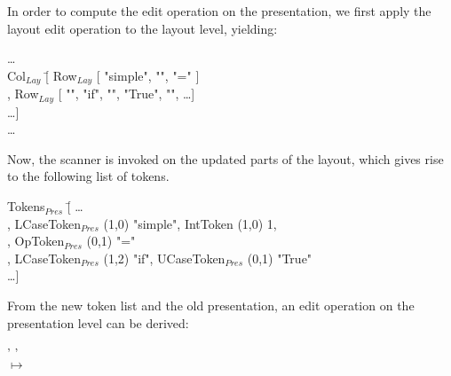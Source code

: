In order to compute the edit operation on the presentation, we first apply the layout edit operation to the layout level, yielding:

\small \ttfamily
\begin{tabbing}
\dots\\
Col$_{Lay}$ \= [ Row$_{Lay}$ [ "simple", "\textvisiblespace", "=" ]\\
                   \> , Row$_{Lay}$ [ "\textvisiblespace\textvisiblespace", 
                                                 "if", "\textvisiblespace", "True", "\textvisiblespace", \dots ] \\
                   \> \dots ]\\
\dots
\end{tabbing}
\rmfamily \normalsize

Now, the scanner is invoked on the updated parts of the layout, which gives rise to the following list of tokens.

\small \ttfamily
\begin{tabbing}
Tokens$_{Pres}$ \= [ \dots \\
                           \> , LCaseToken$_{Pres}$ (1,0) "simple", IntToken (1,0) 1,\\
                           \> , OpToken$_{Pres}$ (0,1) "="\\
                           \> , LCaseToken$_{Pres}$ (1,2) "if", UCaseToken$_{Pres}$ (0,1) "True"\\
                           \> \dots ]                      
\end{tabbing}
\rmfamily \normalsize
 
From the new token list and the old presentation, an edit operation on the presentation level can be derived:

\small \ttfamily
\begin{tabbing}
 \ttfamily ' ' \\
$\mapsto$\\
 \\  
  
\end{tabbing}
\rmfamily \normalsize

